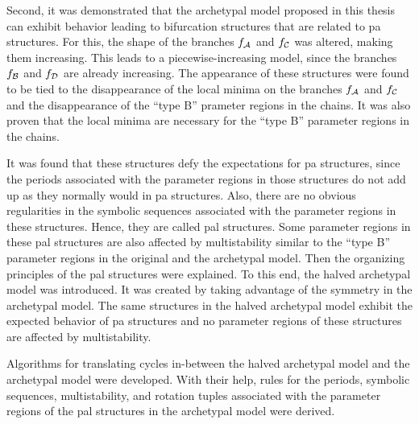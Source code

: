 \clearpage

Second, it was demonstrated that the archetypal model proposed in this thesis can exhibit behavior leading to bifurcation structures that are related to \gls{pa} structures.
For this, the shape of the branches $f_{\mathcal{A}}$ and $f_{\mathcal{C}}$ was altered, making them increasing.
This leads to a piecewise-increasing model, since the branches $f_{\mathcal{B}}$ and $f_{\mathcal{D}}$ are already increasing.
The appearance of these structures were found to be tied to the disappearance of the local minima on the branches $f_{\mathcal{A}}$ and $f_{\mathcal{C}}$ and the disappearance of the ``type B'' prameter regions in the chains.
It was also proven that the local minima are necessary for the ``type B'' parameter regions in the chains.

It was found that these structures defy the expectations for \gls{pa} structures, since the periods associated with the parameter regions in those structures do not add up as they normally would in \gls{pa} structures.
Also, there are no obvious regularities in the symbolic sequences associated with the parameter regions in these structures.
Hence, they are called \gls{pal} structures.
Some parameter regions in these \gls{pal} structures are also affected by multistability similar to the ``type B'' parameter regions in the original and the archetypal model.
Then the organizing principles of the \gls{pal} structures were explained.
To this end, the halved archetypal model was introduced.
It was created by taking advantage of the symmetry in the archetypal model.
The same structures in the halved archetypal model exhibit the expected behavior of \gls{pa} structures and no parameter regions of these structures are affected by multistability.

Algorithms for translating cycles in-between the halved archetypal model and the archetypal model were developed.
With their help, rules for the periods, symbolic sequences, multistability, and rotation tuples associated with the parameter regions of the \gls{pal} structures in the archetypal model were derived.
